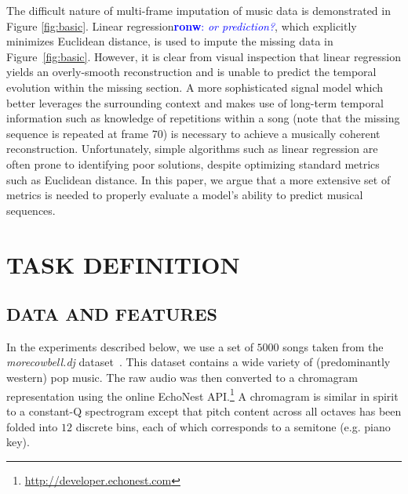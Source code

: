 \documentclass{article}
\newcommand{\FIXME}[2][FIXME]{\textcolor{blue}{\textbf{#1}: \emph{#2}}}
\begin{document}

The difficult nature of multi-frame imputation of music data is
demonstrated in Figure \ref{fig:basic}.
%
Linear regression\FIXME[ronw]{or prediction?}, which explicitly
minimizes Euclidean distance, is used to impute the missing data in
Figure~\ref{fig:basic}.  However, it is clear from visual inspection
that linear regression yields an overly-smooth reconstruction and is
unable to predict the temporal evolution within the missing section.
%
A more sophisticated signal model which better leverages the
surrounding context and makes use of long-term temporal information
such as knowledge of repetitions within a song (note that the
missing sequence is repeated at frame 70) is necessary to achieve a musically
coherent reconstruction.
%
Unfortunately, simple algorithms such as linear regression
are often prone to identifying poor solutions, despite optimizing standard
metrics such as Euclidean distance.
%
In this paper, we argue that a more extensive set of metrics is needed
to properly evaluate a model's ability to predict musical sequences.


\section{TASK DEFINITION}
\label{sec:task}

\subsection{DATA AND FEATURES}
\label{ssec:feats}
In the experiments described below, we use a set of $5000$ songs taken
from the \emph{morecowbell.dj} dataset~\cite{Bertin-Mahieux2010a}.
This dataset contains a wide variety of (predominantly western) pop
music.  The raw audio was then converted to a chromagram
representation using the online EchoNest
API.\footnote{\url{http://developer.echonest.com}} A chromagram is
similar in spirit to a constant-Q spectrogram except that pitch
content across all octaves has been folded into $12$ discrete bins,
each of which corresponds to a semitone (e.g. piano key).
%
\end{document}
